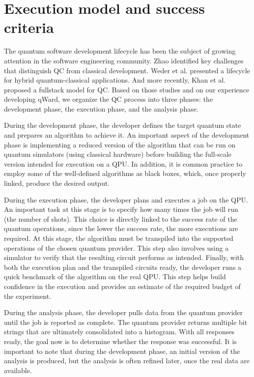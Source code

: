 \documentclass[pdflatex,sn-mathphys-num]{sn-jnl}
\theoremstyle{thmstyleone}%
\theoremstyle{thmstyletwo}%
\theoremstyle{thmstylethree}%
\begin{document}
\FloatBarrier
\section{Execution model and success criteria}\label{sec:measuring-success}

The quantum software development lifecycle has been the subject of growing attention in the software engineering community. Zhao \cite{zhaoQuantumSoftwareEngineering_2020} identified key challenges that distinguish QC from classical development. Weder et al. \cite{wederQuantumSoftwareDevelopment_2022} presented a lifecycle for hybrid quantum-classical applications. And more recently, Khan et al. \cite{khanAdvancingQuantumSoftware_2024} proposed a fullstack model for QC. Based on those studies and on our experience developing qWard, we organize the QC process into three phases: the development phase, the execution phase, and the analysis phase.

During the development phase, the developer defines the target quantum state and prepares an algorithm to achieve it. An important aspect of the development phase is implementing a reduced version of the algorithm that can be run on quantum simulators (using classical hardware) before building the full-scale version intended for execution on a QPU. In addition, it is common practice to employ some of the well-defined algorithms as black boxes, which, once properly linked, produce the desired output.

During the execution phase, the developer plans and executes a job on the QPU. An important task at this stage is to specify how many times the job will run (the number of shots). This choice is directly linked to the success rate of the quantum operations, since the lower the success rate, the more executions are required. At this stage, the algorithm must be transpiled into the supported operations of the chosen quantum provider. This step also involves using a simulator to verify that the resulting circuit performs as intended. Finally, with both the execution plan and the transpiled circuits ready, the developer runs a quick benchmark of the algorithm on the real QPU. This step helps build confidence in the execution and provides an estimate of the required budget of the experiment.

During the analysis phase, the developer pulls data from the quantum provider until the job is reported as complete. The quantum provider returns multiple bit strings that are ultimately consolidated into a histogram. With all responses ready, the goal now is to determine whether the response was successful. It is important to note that during the development phase, an initial version of the analysis is produced, but the analysis is often refined later, once the real data are available.
\end{document}
